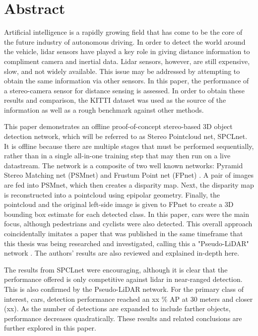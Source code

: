 \section*{Abstract} %

Artificial intelligence is a rapidly growing field that has come to be the core of the future industry of autonomous driving. In order to detect the world around the vehicle, lidar sensors have played a key role in giving distance information to compliment camera and inertial data. Lidar sensors, however, are still expensive, slow, and not widely available. This issue may be addressed by attempting to obtain the same information via other sensors. In this paper, the performance of a stereo-camera sensor for distance sensing is assessed. In order to obtain these results and comparison, the KITTI dataset was used as the source of the information as well as a rough benchmark against other methods. 

This paper demonstrates an offline proof-of-concept stereo-based 3D object detection network, which will be referred to as Stereo Pointcloud net, SPCLnet. It is offline because there are multiple stages that must be performed sequentially, rather than in a single all-in-one training step that may then run on a live datastream. The network is a composite of two well known networks: Pyramid Stereo Matching net (PSMnet) \cite{chang_pyramid_2018} and Frustum Point net (FPnet) \cite{qi_frustum_2017}. A pair of images are fed into PSMnet, which then creates a disparity map. Next, the disparity map is reconstructed into a pointcloud using epipolar geometry. Finally, the pointcloud and the original left-side image is given to FPnet to create a 3D bounding box estimate for each detected class. In this paper, cars were the main focus, although pedestrians and cyclists were also detected. This overall approach coincidentally imitates a paper that was published in the same timeframe that this thesis was being researched and investigated, calling this a "Pseudo-LiDAR" network \cite{wang_pseudo-lidar_2019}. The authors' results are also reviewed and explained in-depth here.

The results from SPCLnet were encouraging, although it is clear that the performance offered is only competitive against lidar in near-ranged detection. This is also confirmed by the Pseudo-LiDAR network. For the primary class of interest, cars, detection performance reached an xx \% AP at 30 meters and closer (xx). As the number of detections are expanded to include farther objects, performance decreases quadratically. These results and related conclusions are further explored in this paper.

